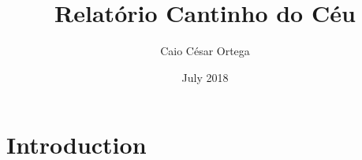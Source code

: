 \documentclass{article}
\title{Relatório Cantinho do Céu}
\author{Caio César Ortega}
\date{July 2018}
\begin{document}
\maketitle

\section{Introduction}
\end{document}
